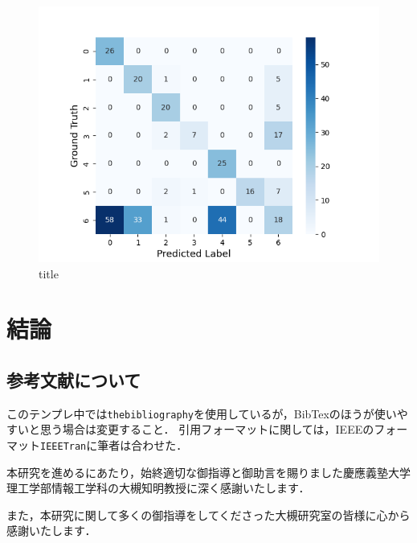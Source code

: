 \begin{figure}[H]
  \begin{center}
  \includegraphics[width=\linewidth]{./fig/noisy_dataset/cross_val_Fold0_threshold0.7_6_6.png}
  \end{center}
\caption{title}
\end{figure}
  

\chapter{結論}

\section{参考文献について}
このテンプレ中では{\tt thebibliography}を使用しているが，BibTexのほうが使いやすいと思う場合は変更すること．
引用フォーマットに関しては，IEEEのフォーマット{\tt IEEETran}に筆者は合わせた．

\begin{acknowledgment}

本研究を進めるにあたり，始終適切な御指導と御助言を賜りました慶應義塾大学理工学部情報工学科の大槻知明教授に深く感謝いたします．

また，本研究に関して多くの御指導をしてくださった大槻研究室の皆様に心から感謝いたします．


\end{acknowledgment}

